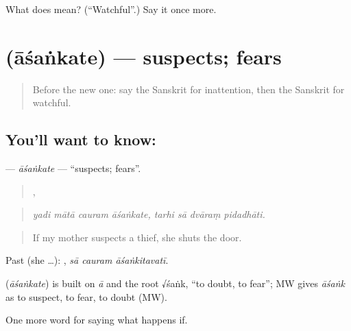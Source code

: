 \begin{tcolorbox}[breakable,colback=teal!4,colframe=teal!35!black,title={Before you move on}]
What does  mean? (\textquotedblleft{}Watchful\textquotedblright{}.) Say it once more.
\end{tcolorbox}
\section[\texorpdfstring{\sk{आशंकते} (āśaṅkate)}{आशंकते (āśaṅkate)}]{ (āśaṅkate) — suspects; fears}

\label{lesson:SA-C539-asankate}



\begin{quote}
Before the new one: say the Sanskrit for inattention, then the Sanskrit for watchful.
\end{quote}

\subsection*{You'll want to know: }
\textbf{} — \emph{āśaṅkate} — \textquotedblleft{}suspects; fears\textquotedblright{}.

\begin{quote}
   ,    
\end{quote}

\begin{quote}
\emph{yadi mātā cauram āśaṅkate, tarhi sā dvāraṃ pidadhāti.}
\end{quote}

\begin{quote}
If my mother suspects a thief, she shuts the door.
\end{quote}

Past (she …):   , \emph{sā cauram āśaṅkitavatī}.

\begin{cousinweb}
\textbf{} (\emph{āśaṅkate}) is built on \emph{ā} and the root √śaṅk, \textquotedblleft{}to doubt, to fear\textquotedblright{}; MW gives \emph{āśaṅk} as to suspect, to fear, to doubt (MW).
\end{cousinweb}

\begin{grammarlens}[title={What you've built}]
One more word for saying what happens if.
\end{grammarlens}

